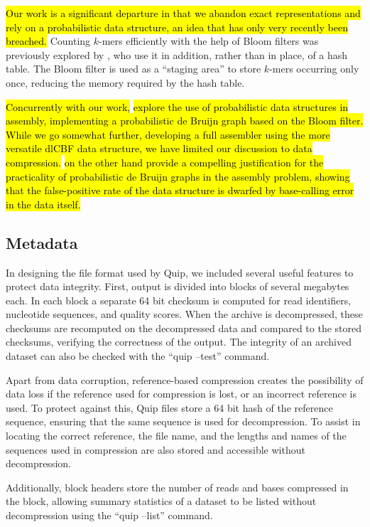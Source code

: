 \documentclass[a4,center,fleqn]{NAR}
\begin{document}
\hl{Our work is a significant departure in that we abandon exact representations
and rely on a probabilistic data structure, an idea that has only very
recently been breached.} Counting $k$-mers efficiently with the help of
Bloom filters was previously explored by \citet{Melsted2011}, who use it in
addition, rather than in place, of a hash table. The Bloom filter is used as a
``staging area'' to store $k$-mers occurring only once, reducing the memory
required by the hash table.

\hl{Concurrently with our work,} \citet{Pell2011} \hl{explore the use of probabilistic
data structures in assembly, implementing a probabilistic de Bruijn graph
based on the Bloom filter. While we go somewhat further, developing a full
assembler using the more versatile dlCBF data structure, we have limited our
discussion to data compression.} \citet{Pell2011} \hl{on the other hand provide a
compelling justification for the practicality of probabilistic de Bruijn
graphs in the assembly problem, showing that the false-positive rate of the
data structure is dwarfed by base-calling error in the data itself.}


\subsection{Metadata}

In designing the file format used by Quip, we included several useful features
to protect data integrity. First, output is divided into blocks of several
megabytes each. In each block a separate 64 bit checksum is computed for read
identifiers, nucleotide sequences, and quality scores. When the archive is
decompressed, these checksums are recomputed on the decompressed data and
compared to the stored checksums, verifying the correctness of the output. The
integrity of an archived dataset can also be checked with the ``quip --test''
command.

Apart from data corruption, reference-based compression creates the
possibility of data loss if the reference used for compression is lost, or an
incorrect reference is used. To protect against this, Quip files store a 64
bit hash of the reference sequence, ensuring that the same sequence is used
for decompression. To assist in locating the correct reference, the file name,
and the lengths and names of the sequences used in compression are also stored
and accessible without decompression.

Additionally, block headers store the number of reads and bases compressed in
the block, allowing summary statistics of a dataset to be listed without
decompression using the ``quip --list'' command.
\end{document}
